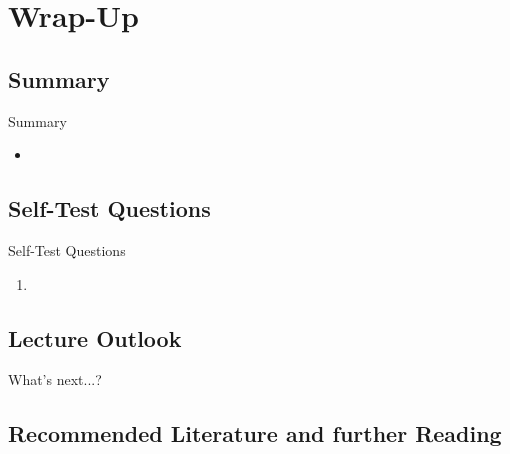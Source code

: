 \section{Wrap-Up}

\subsection{Summary}

\begin{frame}{Summary}{}
	\begin{itemize}
		\item 
	\end{itemize}
\end{frame}


\subsection{Self-Test Questions}

\begin{frame}{Self-Test Questions}{}\important
	\begin{enumerate}
		\item
	\end{enumerate}
\end{frame}


\subsection{Lecture Outlook}

\begin{frame}{What's next...?}{}
\end{frame}


\subsection{Recommended Literature and further Reading}

